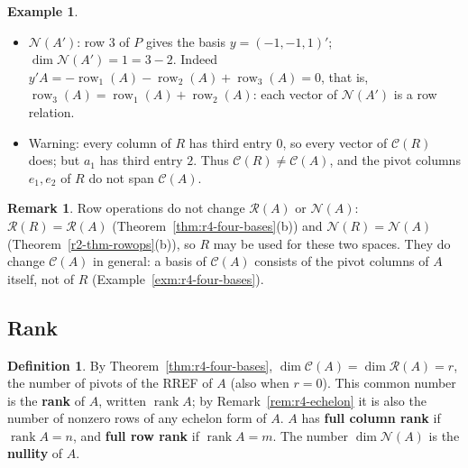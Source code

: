 \documentclass[12pt]{article}
\DeclareMathOperator{\row}{row}
\DeclareMathOperator{\rank}{rank}
\theoremstyle{definition}
\newtheorem{definition}[theorem]{Definition}
\newtheorem{example}[theorem]{Example}
\newtheorem{remark}[theorem]{Remark}
\begin{document}
\begin{example}
\begin{itemize}
\[s_2=\begin{pmatrix}1\\-2\\0\\1\end{pmatrix}\ (x_3=0,\ x_4=1)
\]
form a basis of \(\mathcal N(A)\); \(\dim\mathcal N(A)=2=4-2\). Note \(As_1=-3a_1+a_2+a_3=0\) is the
relation \(a_3=3a_1-a_2\): each special solution is a column relation.
\item \(\mathcal N(A')\): row \(3\) of \(P\) gives the basis \(y=(-1,-1,1)'\);
\(\dim\mathcal N(A')=1=3-2\). Indeed
\(y'A=-\row_1(A)-\row_2(A)+\row_3(A)=0\), that is, \(\row_3(A)=\row_1(A)+\row_2(A)\): each
vector of \(\mathcal N(A')\) is a row relation.
\item Warning: every column of \(R\) has third entry \(0\), so every vector of \(\mathcal C(R)\)
does; but \(a_1\) has third entry \(2\). Thus \(\mathcal C(R)\ne\mathcal C(A)\), and the pivot
columns \(e_1,e_2\) of \(R\) do not span \(\mathcal C(A)\).
\end{itemize}
\end{example}

\begin{remark}\label{rem:r4-warning}
Row operations do not change \(\mathcal R(A)\) or \(\mathcal N(A)\): \(\mathcal R(R)=\mathcal R(A)\)
(Theorem~\ref{thm:r4-four-bases}(b)) and \(\mathcal N(R)=\mathcal N(A)\) (Theorem~\ref{r2-thm-rowops}(b)), so \(R\) may
be used for these two spaces. They do change \(\mathcal C(A)\) in general: a basis of \(\mathcal C(A)\) consists of the
pivot columns of \(A\) itself, not of \(R\) (Example~\ref{exm:r4-four-bases}).
\end{remark}

\subsection*{Rank}

\begin{definition}\label{def:r4-rank}
By Theorem~\ref{thm:r4-four-bases}, \(\dim\mathcal C(A)=\dim\mathcal R(A)=r\), the number of
pivots of the RREF of \(A\) (also when \(r=0\)). This common number is the \textbf{rank} of \(A\),
written \(\rank A\); by Remark~\ref{rem:r4-echelon} it is also the
number of nonzero rows of any echelon form of \(A\). \(A\) has \textbf{full column rank} if
\(\rank A=n\), and \textbf{full row rank} if \(\rank A=m\). The number \(\dim\mathcal N(A)\) is the
\textbf{nullity} of \(A\).
\end{definition}
\end{document}

